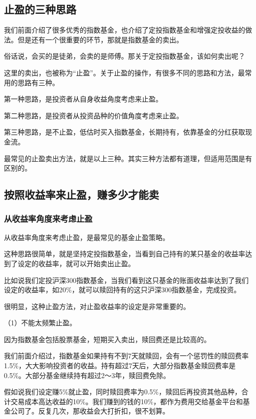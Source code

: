 
\setcounter{figure}{0}\setcounter{table}{0}
\subsection{止盈的三种思路}
我们前面介绍了很多优秀的指数基金，也介绍了定投指数基金和增强定投收益的做法。但是还有一个很重要的环节，那就是指数基金的卖出。

俗话说，会买的是徒弟，会卖的是师傅。那关于定投指数基金，该如何卖出呢？

这里的卖出，也被称为“止盈”。关于止盈的操作，有很多不同的思路和方法，最常用的思路有三种。

第一种思路，是投资者从自身收益角度考虑来止盈。

第二种思路，是投资者从投资品种的价值角度考虑来止盈。

第三种思路，是不止盈，低估时买入指数基金，长期持有，依靠基金的分红获取现金流。

最常见的止盈卖出方法，就是以上三种。其实三种方法都有道理，但适用范围是有区别的。

\subsection{按照收益率来止盈，赚多少才能卖}
\subsubsection{从收益率角度来考虑止盈}

从收益率角度来考虑止盈，是最常见的基金止盈策略。

这种思路很简单，就是坚持定投指数基金，当看到自己持有的某只基金的收益率达到了设定的收益率，就可以开始卖出止盈。

比如说我们定投沪深300指数基金，当我们看到这只基金的账面收益率达到了我们设定的收益率，如20\%，就可以赎回持有的这只沪深300指数基金，完成投资。

很明显，这种止盈方法，对止盈收益率的设定是非常重要的。

（1）不能太频繁止盈。

因为指数基金包括股票基金，短期买入卖出，赎回费还是比较高的。

我们前面介绍过，指数基金如果持有不到7天就赎回，会有一个惩罚性的赎回费率1.5\%，大大影响投资者的收益。持有超过7天后，大部分指数基金赎回费率是0.5\%。大部分基金继续持有超过2～3年，赎回费免除。

假如说我们设定赚5\%就止盈，同时赎回费率为0.5\%，赎回后再投资其他品种，合计交易成本高达收益的10\%。我们赚到的钱的10\%，都作为费用交给基金平台和基金公司了。反复几次，那收益会大打折扣，很不划算。

